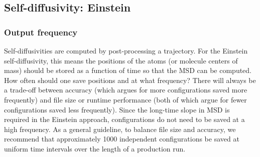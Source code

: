 \documentclass[9pt,bestpractices]{livecoms}
\begin{document}

\subsection{Self-diffusivity: Einstein} \label{sec:Self-Diffusivity Einstein}


\subsubsection{Output frequency} \label{sec:Self-Diffusivity:Einstein: Output frequency}

Self-diffusivities are computed by post-processing a trajectory. For the Einstein self-diffusivity, this means the positions of the atoms (or molecule centers of mass) should be stored as a function of time so that the MSD can be computed. How often should one save positions and at what frequency? There will always be a trade-off between accuracy (which argues for more configurations saved more frequently) and file size or runtime performance (both of which argue for fewer configurations saved less frequently). Since the long-time slope in MSD is required in the Einstein approach, configurations do not need to be saved at a high frequency. As a general guideline, to balance file size and accuracy, we recommend that approximately 1000 independent configurations be saved at uniform time intervals over the length of a production run.
\end{document}
